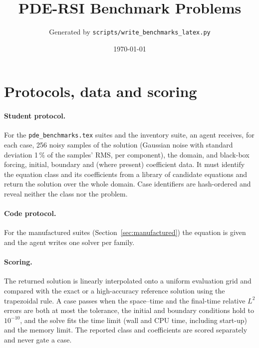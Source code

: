 \documentclass[11pt]{article}
\title{PDE-RSI Benchmark Problems}
\author{Generated by \texttt{scripts/write\_benchmarks\_latex.py}}
\date{\today}
\begin{document}
\maketitle
\tableofcontents

\section{Protocols, data and scoring}

\paragraph{Student protocol.} For the \texttt{pde\_benchmarks.tex} suites and the inventory suite, an agent receives,
for each case, 256 noisy samples of the solution (Gaussian noise with standard deviation 1\,\% of the samples' RMS,
per component), the domain, and black-box forcing, initial, boundary and (where present) coefficient data. It must
identify the equation class and its coefficients from a library of candidate equations and return the solution over
the whole domain. Case identifiers are hash-ordered and reveal neither the class nor the problem.

\paragraph{Code protocol.} For the manufactured suites (Section~\ref{sec:manufactured}) the equation is given and the
agent writes one solver per family.

\paragraph{Scoring.} The returned solution is linearly interpolated onto a uniform evaluation grid and compared with
the exact or a high-accuracy reference solution using the trapezoidal rule. A case passes when the space--time and
the final-time relative $L^2$ errors are both at most the tolerance, the initial and boundary conditions hold to
$10^{-10}$, and the solve fits the time limit (wall and CPU time, including start-up) and the memory limit. The
reported class and coefficients are scored separately and never gate a case.
\end{document}
